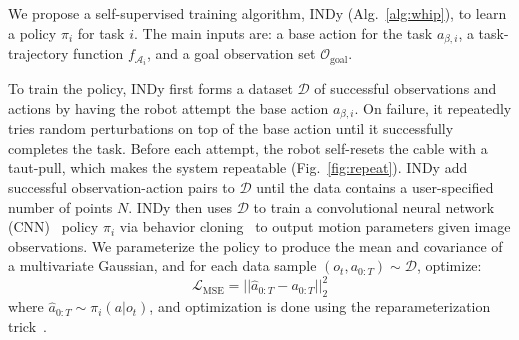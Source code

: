 We propose a self-supervised training algorithm, INDy (Alg.~\ref{alg:whip}), to learn a policy $\pi_i$ for task $i$. The main inputs are:
a base action for the task $a_{\beta,i}$, 
a task-trajectory function $f_{\mathcal{A}_i}$, and
a goal observation set $\mathcal{O}_\mathrm{goal}$.

To train the policy, INDy
first forms a dataset $\mathcal{D}$ of successful observations and actions by having the robot attempt the base action $a_{\beta, i}$.  On failure, it repeatedly tries random perturbations on top of the base action until it successfully completes the task.  Before each attempt, the robot self-resets the cable with a taut-pull, which makes the system repeatable (Fig.~\ref{fig:repeat}). INDy add successful observation-action pairs to $\mathcal{D}$ until the data contains a user-specified number of points $N$. INDy then uses $\mathcal{D}$ to train a convolutional neural network (CNN)~\cite{krizhevsky2012imagenet} policy $\pi_i$ via behavior cloning~\cite{Pomerleau_behavior_cloning,ross2011reduction} to output motion parameters given image observations. We parameterize the policy to produce the mean and covariance of a multivariate Gaussian, and for each data sample $(o_t, a_{0:T}) \sim \mathcal{D}$, optimize:
\begin{equation}\label{eq:loss}
\mathcal{L}_{\mathrm{MSE}} = ||\hat{a}_{0:T} - a_{0:T}||_2^2
\end{equation}
where $\hat{a}_{0:T}\sim \pi_i(a|o_t)$, and optimization is done using the reparameterization trick~\cite{vae}.




